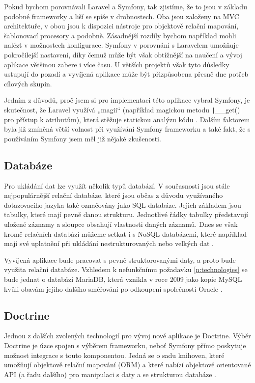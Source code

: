 Pokud bychom porovnávali Laravel a Symfony, tak zjistíme, že to jsou v základu podobné frameworky a liší se spíše v drobnostech. Oba jsou založeny na MVC architektuře, v obou jsou k dispozici nástroje pro objektově relační mapování, šablonovací procesory a podobně. Zásadnější rozdíly bychom například mohli nalézt v možnostech konfigurace. Symfony v porovnání s Laravelem umožňuje pokročilejší nastavení, díky čemuž může být však obtížnější na naučení a vývoj aplikace většinou zabere i více času. U větších projektů však tyto důsledky ustupují do pozadí a vyvíjená aplikace může být přizpůsobena přesně dne potřeb cílových skupin. \cite{symfony_laravel_comparison}

Jedním z důvodů, proč jsem si pro implementaci této aplikace vybral Symfony, je skutečnost, že Laravel využívá „magii“ (například magickou metodu \texttt|__get()| pro přístup k atributům), která stěžuje statickou analýzu kódu \cite{larastan}. Dalším faktorem byla již zmíněná větší volnost při využívání Symfony frameworku a také fakt, že s používáním Symfony jsem měl již nějaké zkušenosti.

\subsection{Databáze}
Pro ukládání dat lze využít několik typů databází. V současnosti jsou stále nejpopulárnější relační databáze, které jsou občas z důvodu využívaného dotazovacího jazyka také označovány jako SQL databáze. Jejich základem jsou tabulky, které mají pevně danou strukturu. Jednotlivé řádky tabulky  představují uložené záznamy a sloupce obsahují vlastnosti daných záznamů. \cite{databases} Dnes se však kromě relačních databází můžeme setkat i s NoSQL databázemi, které například mají své uplatnění při ukládání nestrukturovaných nebo velkých dat \cite{nosql}.

Vyvíjená aplikace bude pracovat s pevně struktorovanými daty, a proto bude využita relační databáze. Vzhledem k nefunkčnímu požadavku \ref{n:technologies} se bude jednat o databázi MariaDB, která vznikla v roce 2009 jako kopie MySQL kvůli obavám jejího dalšího směřování po odkoupení společností Oracle \cite{mariadb}.

\subsection{Doctrine}
Jednou z dalších zvolených technologií pro vývoj nové aplikace je Doctrine. Výběr Doctrine je úzce spojen s výběrem frameworku, neboť Symfony přímo poskytuje možnost integrace s touto komponentou. Jedná se o sadu knihoven, které umožňují objektově relační mapování (ORM) a které nabízí objektově orientované API (a řadu dalšího) pro manipulaci s daty a se strukturou databáze \cite{doctrine_orm, doctrine_dbal}.

